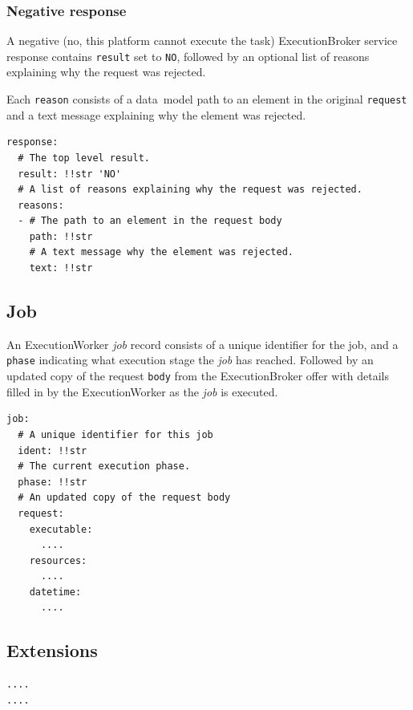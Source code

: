 \documentclass[11pt,a4paper]{ivoa}
\newcommand{\datamodel} {data~model}
\newcommand{\execbrokerclass} {ExecutionBroker}
\newcommand{\execworkerclass} {ExecutionWorker}
\newcommand{\codeword}[1] {\texttt{#1}}
\newcommand{\workerjob} {\textit{job}}
\begin{document}
\subsubsection{Negative response}
\label{datamodel-negative-response}

A negative (no, this platform cannot execute the task) \execbrokerclass{} service response contains \codeword{result}
set to \codeword{NO}, followed by an optional list of reasons
explaining why the request was rejected.

Each \codeword{reason} consists of a \datamodel{} path to an element in the original
\codeword{request} and a text message explaining why the element was rejected.

\begin{lstlisting}[]
response:
  # The top level result.
  result: !!str 'NO'
  # A list of reasons explaining why the request was rejected.
  reasons:
  - # The path to an element in the request body
    path: !!str
    # A text message why the element was rejected.
    text: !!str
\end{lstlisting}


\subsection{Job}
\label{datamodel-job}

An \execworkerclass{} \workerjob{} record consists of a unique identifier for the job,
and a \codeword{phase} indicating what execution stage the \workerjob{} has reached.
Followed by an updated copy of the request \codeword{body} from the \execbrokerclass{}
offer with details filled in by the \execworkerclass{} as the \workerjob{} is executed.

\begin{lstlisting}[]
job:
  # A unique identifier for this job
  ident: !!str
  # The current execution phase.
  phase: !!str
  # An updated copy of the request body
  request:
    executable:
      ....
    resources:
      ....
    datetime:
      ....
\end{lstlisting}

\subsection{Extensions}
\label{datamodel-extensions}

\begin{lstlisting}[]
....
....
\end{lstlisting}
\end{document}
